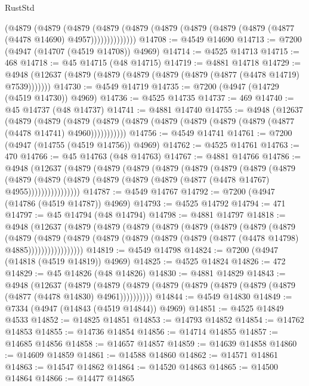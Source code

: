 \begin{lexlean}{RustStd}
\begin{coremodule}
            (@4879
              (@4879
                (@4879
                  (@4879
                    (@4879 (@4879 (@4879 (@4879 (@4879 (@4877 (@4478 @14690) @4957))))))))))))))
@14708 := @4549 @14690
@14713 := @7200 (@4947 (@14707 (@4519 @14708)) @4969)
@14714 := @4525 @14713
@14715 := 468
@14718 := @45 @14715 (@48 @14715)
@14719 := @4881 @14718
@14729 := @4948 (@12637 (@4879 (@4879 (@4879 (@4879 (@4879 (@4877 (@4478 @14719) @7539)))))))
@14730 := @4549 @14719
@14735 := @7200 (@4947 (@14729 (@4519 @14730)) @4969)
@14736 := @4525 @14735
@14737 := 469
@14740 := @45 @14737 (@48 @14737)
@14741 := @4881 @14740
@14755 := @4948
    (@12637
      (@4879
        (@4879
          (@4879 (@4879 (@4879 (@4879 (@4879 (@4879 (@4879 (@4877 (@4478 @14741) @4960)))))))))))
@14756 := @4549 @14741
@14761 := @7200 (@4947 (@14755 (@4519 @14756)) @4969)
@14762 := @4525 @14761
@14763 := 470
@14766 := @45 @14763 (@48 @14763)
@14767 := @4881 @14766
@14786 := @4948
    (@12637
      (@4879
        (@4879
          (@4879
            (@4879
              (@4879
                (@4879
                  (@4879
                    (@4879
                      (@4879
                        (@4879
                          (@4879 (@4879 (@4879 (@4879 (@4877 (@4478 @14767) @4955))))))))))))))))
@14787 := @4549 @14767
@14792 := @7200 (@4947 (@14786 (@4519 @14787)) @4969)
@14793 := @4525 @14792
@14794 := 471
@14797 := @45 @14794 (@48 @14794)
@14798 := @4881 @14797
@14818 := @4948
    (@12637
      (@4879
        (@4879
          (@4879
            (@4879
              (@4879
                (@4879
                  (@4879
                    (@4879
                      (@4879
                        (@4879
                          (@4879
                            (@4879 (@4879 (@4879 (@4879 (@4877 (@4478 @14798) @4885)))))))))))))))))
@14819 := @4549 @14798
@14824 := @7200 (@4947 (@14818 (@4519 @14819)) @4969)
@14825 := @4525 @14824
@14826 := 472
@14829 := @45 @14826 (@48 @14826)
@14830 := @4881 @14829
@14843 := @4948
    (@12637
      (@4879 (@4879 (@4879 (@4879 (@4879 (@4879 (@4879 (@4879 (@4877 (@4478 @14830) @4961))))))))))
@14844 := @4549 @14830
@14849 := @7334 (@4947 (@14843 (@4519 @14844)) @4969)
@14851 := @4525 @14849 @4533
@14852 := @14825 @14851
@14853 := @14793 @14852
@14854 := @14762 @14853
@14855 := @14736 @14854
@14856 := @14714 @14855
@14857 := @14685 @14856
@14858 := @14657 @14857
@14859 := @14639 @14858
@14860 := @14609 @14859
@14861 := @14588 @14860
@14862 := @14571 @14861
@14863 := @14547 @14862
@14864 := @14520 @14863
@14865 := @14500 @14864
@14866 := @14477 @14865

\end{coremodule}
\end{lexlean}
